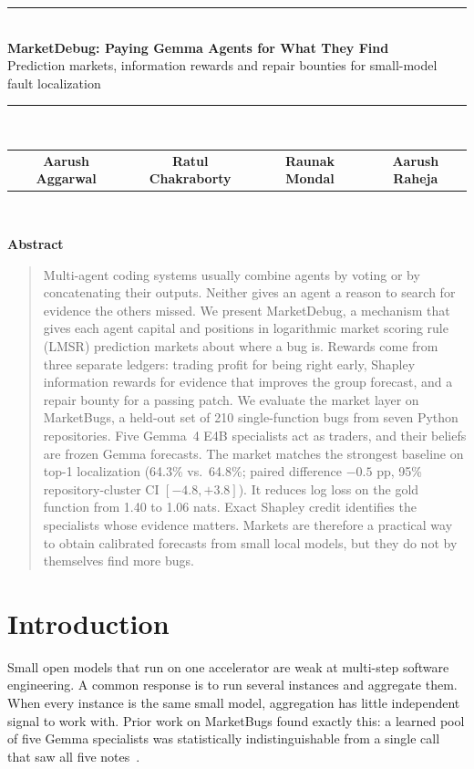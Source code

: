 \documentclass[10pt]{article}
\begin{document}
\begin{center}
\rule{\textwidth}{2pt}\\[8pt]
{\LARGE\bfseries MarketDebug: Paying Gemma Agents for What They Find}\\[6pt]
{\large Prediction markets, information rewards and repair bounties for small-model fault localization}\\[6pt]
\rule{\textwidth}{0.5pt}\\[12pt]
\begin{tabular}{cccc}
\textbf{Aarush Aggarwal} & \textbf{Ratul Chakraborty} & \textbf{Raunak Mondal} & \textbf{Aarush Raheja}
\end{tabular}\\[4pt]

\end{center}

\vspace{6pt}
\begin{center}\textbf{Abstract}\end{center}
\begin{quote}\small
Multi-agent coding systems usually combine agents by voting or by concatenating their outputs. Neither gives an agent a reason to search for evidence the others missed. We present MarketDebug, a mechanism that gives each agent capital and positions in logarithmic market scoring rule (LMSR) prediction markets about where a bug is. Rewards come from three separate ledgers: trading profit for being right early, Shapley information rewards for evidence that improves the group forecast, and a repair bounty for a passing patch. We evaluate the market layer on MarketBugs, a held-out set of 210 single-function bugs from seven Python repositories. Five Gemma~4 E4B specialists act as traders, and their beliefs are frozen Gemma forecasts. The market matches the strongest baseline on top-1 localization (64.3\% vs.\ 64.8\%; paired difference $-0.5$ pp, 95\% repository-cluster CI $[-4.8, +3.8]$). It reduces log loss on the gold function from 1.40 to 1.06 nats. Exact Shapley credit identifies the specialists whose evidence matters. Markets are therefore a practical way to obtain calibrated forecasts from small local models, but they do not by themselves find more bugs.
\end{quote}

\section{Introduction}
Small open models that run on one accelerator are weak at multi-step software engineering. A common response is to run several instances and aggregate them. When every instance is the same small model, aggregation has little independent signal to work with. Prior work on MarketBugs found exactly this: a learned pool of five Gemma specialists was statistically indistinguishable from a single call that saw all five notes~\cite{marketbugs}.
\end{document}
